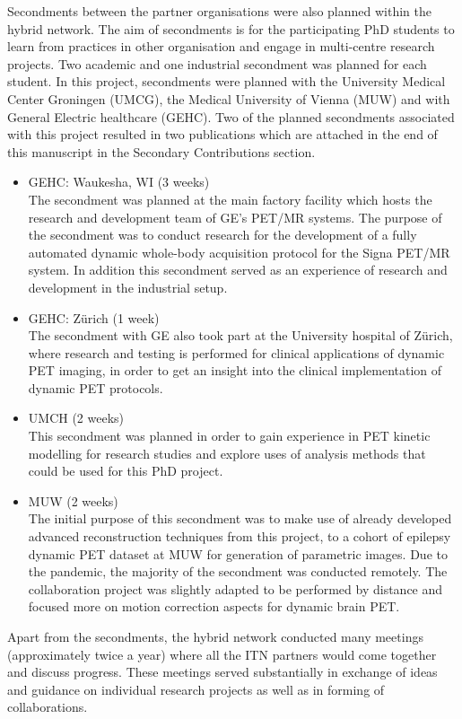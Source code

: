 Secondments between the partner organisations were also planned within the \gls{hybrid} network. The aim of secondments is for the participating PhD students to learn from practices in other organisation and engage in multi-centre research projects. Two academic and one industrial secondment was planned for each student. 
In this project, secondments were planned with the University Medical Center Groningen (UMCG), the Medical University of Vienna (MUW) and with General Electric healthcare (GEHC).
Two of the planned secondments associated with this project resulted in two publications which are attached in the end of this manuscript in the Secondary Contributions section. 

\begin{itemize}
    \item GEHC: Waukesha, WI (3 weeks) \\
    The secondment was planned at the main factory facility which hosts the research and development team of GE's PET/MR systems. The purpose of the secondment was to conduct research for the development of a fully automated dynamic whole-body acquisition protocol for the Signa PET/MR system.
    In addition this secondment served as an experience of research and development in the industrial setup.
    \item GEHC: Zürich (1 week) \\
    The secondment with GE also took part at the University hospital of Zürich, where research and testing is performed for clinical applications of dynamic PET imaging, in order to get an insight into the clinical implementation of dynamic PET protocols.
    \item UMCH (2 weeks) \\
    This secondment was planned in order to gain experience in PET kinetic modelling for research studies and explore uses of analysis methods that could be used for this PhD project. 
    \item MUW (2 weeks) \\
    The initial purpose of this secondment was to make use of already developed advanced reconstruction techniques from this project, to a cohort of epilepsy dynamic PET dataset at MUW for generation of parametric images. Due to the pandemic, the majority of the secondment was conducted remotely. The collaboration project was slightly adapted to be performed by distance and focused more on motion correction aspects for dynamic brain PET.
    
\end{itemize}

Apart from the secondments, the \gls{hybrid} network conducted many meetings (approximately twice a year) where all the ITN partners would come together and discuss progress. These meetings served substantially in exchange of ideas and guidance on individual research projects as well as in forming of collaborations. 

